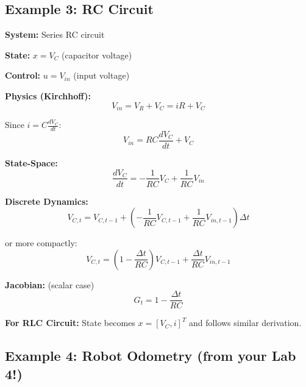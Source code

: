 \subsection{Example 3: RC Circuit}

\begin{tcolorbox}[colback=blue!5!white,colframe=blue!75!black,title=RC Circuit Dynamics]

\textbf{System:} Series RC circuit

\textbf{State:} $x = V_C$ (capacitor voltage)

\textbf{Control:} $u = V_{in}$ (input voltage)

\textbf{Physics (Kirchhoff):}
\begin{equation}
V_{in} = V_R + V_C = iR + V_C
\end{equation}

Since $i = C\frac{dV_C}{dt}$:
\begin{equation}
V_{in} = RC\frac{dV_C}{dt} + V_C
\end{equation}

\textbf{State-Space:}
\begin{equation}
\frac{dV_C}{dt} = -\frac{1}{RC}V_C + \frac{1}{RC}V_{in}
\end{equation}

\textbf{Discrete Dynamics:}
\begin{equation}
V_{C,t} = V_{C,t-1} + \left(-\frac{1}{RC}V_{C,t-1} + \frac{1}{RC}V_{in,t-1}\right)\Delta t
\end{equation}

or more compactly:
\begin{equation}
V_{C,t} = \left(1 - \frac{\Delta t}{RC}\right)V_{C,t-1} + \frac{\Delta t}{RC}V_{in,t-1}
\end{equation}

\textbf{Jacobian:} (scalar case)
\begin{equation}
G_t = 1 - \frac{\Delta t}{RC}
\end{equation}

\textbf{For RLC Circuit:} State becomes $x = [V_C, i]^T$ and follows similar derivation.

\end{tcolorbox}

\subsection{Example 4: Robot Odometry (from your Lab 4!)}

